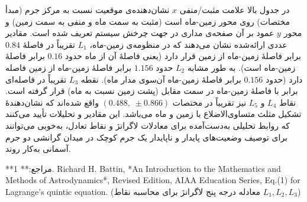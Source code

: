 در جدول بالا علامت مثبت/منفی $x$ نشان‌دهنده‌ی موقعیت نسبت به مرکز جرم (مبدأ مختصات) روی محور زمین-ماه است (مثبت به سمت ماه و منفی به سمت زمین) و محور $y$ عمود بر آن صفحه‌ی مداری در جهت چرخش سیستم تعریف شده است. مقادیر عددی ارائه‌شده نشان می‌دهند که در منظومه‌ی زمین-ماه، $L_1$ تقریباً در فاصلهٔ $0.84$ برابر فاصلهٔ زمین-ماه از زمین قرار دارد (یعنی فاصلهٔ آن از ماه حدود $0.16$ برابر فاصلهٔ زمین-ماه است). به طور مشابه $L_2$ حدود $1.156$ برابر فاصلهٔ زمین-ماه از زمین فاصله دارد (حدود $0.156$ برابر فاصلهٔ زمین-ماه آن‌سوی مدار ماه). نقطه $L_3$ تقریباً در فاصله‌ای برابر با فاصلهٔ زمین-ماه در سمت مقابل (پشت زمین نسبت به ماه) قرار گرفته است. نقاط $L_4$ و $L_5$ نیز تقریباً در مختصات $(0.488,\;\pm0.866)$ واقع شده‌اند که نشان‌دهندهٔ تشکیل مثلث متساوی‌الاضلاع با زمین و ماه می‌باشد. این مقادیر و تحلیلات تأیید می‌کنند که روابط تحلیلی به‌دست‌آمده برای معادلات لاگرانژ و نقاط تعادل، به‌خوبی می‌توانند برای توصیف وضعیت‌های پایدار و ناپایدار یک جرم کوچک در میدان گرانشی دو جرم آسمانی به‌کار روند. 

**مراجع:**  
1. Richard H. Battin, *An Introduction to the Mathematics and Methods of Astrodynamics*, Revised Edition, AIAA Education Series, Eq.(1) for Lagrange’s quintic equation. (معادله درجه پنج لاگرانژ برای محاسبه نقاط $L_1, L_2, L_3$)